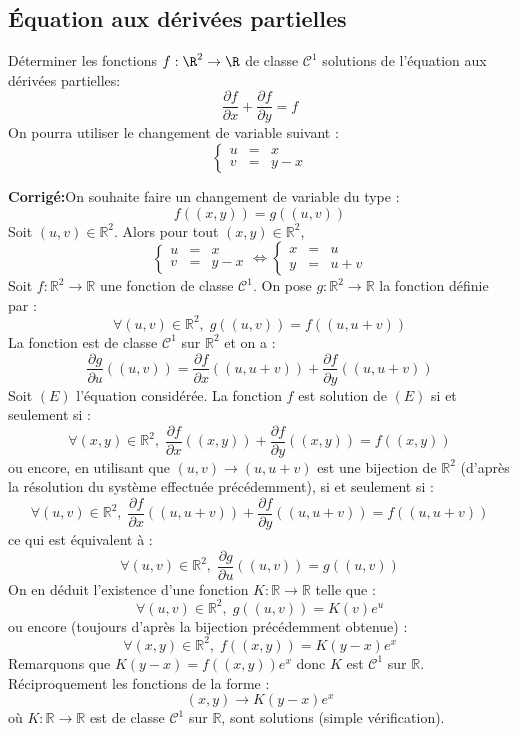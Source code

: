 \documentclass[a4paper,twoside,french,11pt]{VcCours}
\newcommand{\corr}{\textbf{Corrigé:}}
\begin{document}
\subsection{Équation aux dérivées partielles}




\begin{Exercice}{} Déterminer les fonctions $f : \R^{2} \rightarrow \R$ de classe $\mathcal{C}^{1}$ solutions de l'équation aux dérivées partielles:
  \[
  \frac{\partial f}{\partial x} + \frac{\partial f}{\partial y} = f
  \]
On pourra utiliser le changement de variable suivant :
  \[
  \left\lbrace\begin{array}{lll}
    u & = &  x \\
    v & = & y - x
  \end{array}\right.
  \]
\end{Exercice} 

\corr On souhaite faire un changement de variable du type :
$$ f((x,y))=g((u,v))$$
Soit $(u,v) \in \mathbb{R}^2$. Alors pour tout $(x,y) \in \mathbb{R}^2$,
$$  \left\lbrace\begin{array}{lll}
    u & = &  x \\
    v & = & y - x
  \end{array}\right. \Longleftrightarrow  \left\lbrace\begin{array}{lll}
    x & = &  u \\
    y & = & u+v
  \end{array}\right.$$
 Soit $f : \mathbb{R}^2 \rightarrow \mathbb{R}$ une fonction de classe $\mathcal{C}^1$. On pose $g : \mathbb{R}^2 \rightarrow \mathbb{R}$ la fonction définie par :
 $$ \forall (u,v) \in \mathbb{R}^2, \; g((u,v)) = f((u,u+v))$$
 La fonction est de classe $\mathcal{C}^1$ sur $\mathbb{R}^2$ et on a :
 $$ \dfrac{\partial g}{\partial u} ((u,v)) = \dfrac{\partial f}{\partial x} ((u,u+v)) + \dfrac{\partial f}{\partial y} ((u,u+v))$$
 Soit $(E)$ l'équation considérée. La fonction $f$ est solution de $(E)$ si et seulement si :
 $$ \forall (x,y) \in \mathbb{R}^2, \;  \frac{\partial f}{\partial x}((x,y)) + \frac{\partial f}{\partial y}((x,y)) = f((x,y))$$
 ou encore, en utilisant que $(u,v) \rightarrow (u,u+v)$ est une bijection de $\mathbb{R}^2$ (d'après la résolution du système effectuée précédemment), si et seulement si :
 $$ \forall (u,v) \in \mathbb{R}^2, \;  \frac{\partial f}{\partial x}((u,u+v)) + \frac{\partial f}{\partial y}((u,u+v)) = f((u,u+v))$$
 ce qui est équivalent à :
 $$ \forall (u,v) \in \mathbb{R}^2, \; \dfrac{\partial g}{\partial u} ((u,v)) = g((u,v))$$
On en déduit l'existence d'une fonction $K : \mathbb{R} \rightarrow \mathbb{R}$ telle que :
$$  \forall (u,v) \in \mathbb{R}^2, \; g((u,v)) = K(v) e^{u}$$
ou encore (toujours d'après la bijection précédemment obtenue) :
$$  \forall (x,y) \in \mathbb{R}^2, \;  f((x,y)) = K(y-x) e^x$$
Remarquons que $K(y-x)= f((x,y))e^{x}$ donc $K$ est $\mathcal{C}^1$ sur $\mathbb{R}$. Réciproquement les fonctions de la forme :
$$ (x,y) \rightarrow  K(y-x) e^x$$
où $K : \mathbb{R} \rightarrow \mathbb{R}$ est de classe $\mathcal{C}^1$ sur $\mathbb{R}$, sont solutions (simple vérification).
\end{document}
